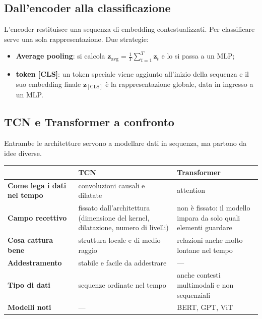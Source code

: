 \documentclass[11pt,a4paper]{article}
\begin{document}
\subsection{Dall'encoder alla classificazione}

L'encoder restituisce una sequenza di embedding contestualizzati. Per classificare serve una 
sola rappresentazione. Due strategie:
\begin{itemize}
    \item \textbf{Average pooling}: si calcola $\mathbf{z}_{\text{avg}}=\frac{1}{T}\sum_{t=1}^{T}\mathbf{z}_t$ e lo si passa a un MLP;
    \item \textbf{token [CLS]}: un token speciale viene aggiunto all'inizio della sequenza e il suo
     embedding finale $\mathbf{z}_{[\text{CLS}]}$ è la rappresentazione globale, data in ingresso a un MLP.
\end{itemize}

\subsection{TCN e Transformer a confronto}

Entrambe le architetture servono a modellare dati in sequenza, ma partono da idee diverse.

\begin{center}
\renewcommand{\arraystretch}{1.4}
\begin{tabular}{|p{3.3cm}|p{5.6cm}|p{5.6cm}|}
\hline
 & \textbf{TCN} & \textbf{Transformer} \\
\hline
\textbf{Come lega i dati nel tempo} & convoluzioni causali e dilatate & attention \\
\hline
\textbf{Campo recettivo} & fissato dall'architettura (dimensione del kernel, dilatazione, numero di livelli) 
& non è fissato: il modello impara da solo quali elementi guardare \\
\hline
\textbf{Cosa cattura bene} & struttura locale e di medio raggio & relazioni anche molto lontane nel tempo \\
\hline
\textbf{Addestramento} & stabile e facile da addestrare & --- \\
\hline
\textbf{Tipo di dati} & sequenze ordinate nel tempo & anche contesti multimodali e non sequenziali \\
\hline
\textbf{Modelli noti} & --- & BERT, GPT, ViT \\
\hline
\end{tabular}
\end{center}
\end{document}
